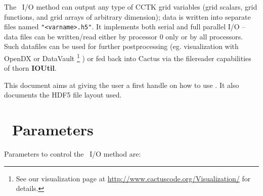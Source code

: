 \documentclass{article}
\begin{document}
The \ThisThorn\ I/O method can output any type of CCTK grid variables
(grid scalars, grid functions, and grid arrays of arbitrary dimension);
data is written into separate files named {\tt "<varname>.h5"}.
It implements both serial and full parallel I/O --
data files can be written/read either by processor 0 only or by all processors.
Such datafiles can be used for further postprocessing (eg. visualization with
OpenDX or DataVault%
\footnote{%
         See our visualization page at
	 \url{http://www.cactuscode.org/Visualization/}
	 for details.
	 }%
) or fed back into Cactus via the filereader capabilities of thorn
{\bf IOUtil}.

This document aims at giving the user a first handle on how to use
\ThisThorn. It also documents the HDF5 file layout used.


\section{\ThisThorn\ Parameters}

Parameters to control the \ThisThorn\ I/O method are:
\end{document}
